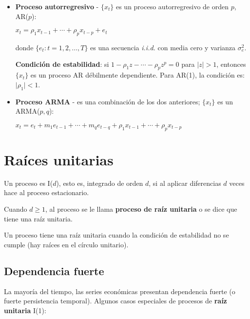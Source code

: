 \documentclass[10pt, a4paper, landscape]{article}
\begin{document}
\begin{multicols}{3}
\begin{itemize}[leftmargin=*]
			\item \textbf{Proceso autorregresivo} - $\lbrace x_{t} \rbrace$ es un proceso autorregresivo de orden $p$, AR($p$):
			
			\begin{center}
				$x_{t} = \rho_{1} x_{t - 1} + \cdots + \rho_{p} x_{t - p} + e_{t}$
			\end{center}
			
			donde $\lbrace e_{t}: t = 1, 2, \ldots, T \rbrace$ es una secuencia \textsl{i.i.d.} con media cero y varianza $\sigma^{2}_{e}$.
			
			\textbf{Condición de estabilidad}: si $1 - \rho_{1} z - \cdots - \rho_{p} z^{p} = 0$ para $\lvert z \rvert > 1$, entonces $\lbrace x_{t} \rbrace$ es un proceso AR débilmente dependiente. Para AR(1), la condición es: $\lvert \rho_{1} \rvert < 1$.
		
			\item \textbf{Proceso ARMA} - es una combinación de los dos anteriores; $\lbrace x_{t} \rbrace$ es un ARMA($p, q$):
			
			\begin{center}
				$x_{t} = e_{t} + m_{1} e_{t - 1} + \cdots + m_{q} e_{t - q} + \rho_{1} x_{t - 1} + \cdots + \rho_{p} x_{t - p}$
			\end{center}
		\end{itemize}
		
		\columnbreak
		
		\section*{Raíces unitarias}
		
		Un proceso es I($d$), esto es, integrado de orden $d$, si al aplicar diferencias $d$ veces hace al proceso estacionario.
		
		Cuando $d \geq 1$, al proceso se le llama \textbf{proceso de raíz unitaria} o se dice que tiene una raíz unitaria.
		
		Un proceso tiene una raíz unitaria cuando la condición de estabilidad no se cumple (hay raíces en el círculo unitario).
		
		\subsection*{Dependencia fuerte}
		
		La mayoría del tiempo, las series económicas presentan dependencia fuerte (o fuerte persistencia temporal). Algunos casos especiales de procesos de \textbf{raíz unitaria} I(1):
		

\end{multicols}
\end{document}
